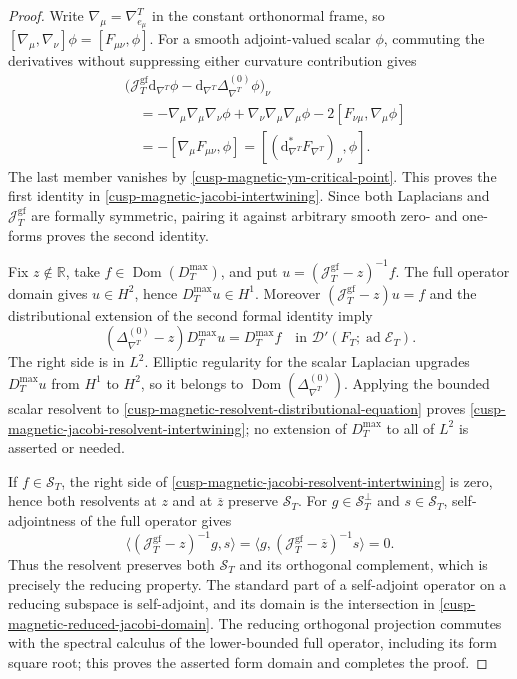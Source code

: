 \begin{proof}
Write \(\nabla_\mu=\nabla^T_{e_\mu}\) in the constant orthonormal frame,
so
\([\nabla_\mu,\nabla_\nu]\phi=[F_{\mu\nu},\phi]\).
For a smooth adjoint-valued scalar \(\phi\), commuting the derivatives
without suppressing either curvature contribution gives
\begin{align*}
 &\bigl(\mathcal J_T^{\mathrm{gf}}\mathrm d_{\nabla^T}\phi
       -\mathrm d_{\nabla^T}\Delta_{\nabla^T}^{(0)}\phi\bigr)_\nu\\
 &\quad=-\nabla_\mu\nabla_\mu\nabla_\nu\phi
         +\nabla_\nu\nabla_\mu\nabla_\mu\phi
         -2[F_{\nu\mu},\nabla_\mu\phi]\\
 &\quad=-[\nabla_\mu F_{\mu\nu},\phi]
   =[ (\mathrm d_{\nabla^T}^*F_{\nabla^T})_\nu,\phi].
\end{align*}
The last member vanishes by
\cref{cusp-magnetic-ym-critical-point}.  This proves the first identity
in \eqref{cusp-magnetic-jacobi-intertwining}.  Since both Laplacians and
\(\mathcal J_T^{\mathrm{gf}}\) are formally symmetric, pairing it against
arbitrary smooth zero- and one-forms proves the second identity.

Fix \(z\notin\mathbb R\), take
\(f\in\operatorname{Dom}(D_T^{\max})\), and put
\(u=(\mathcal J_T^{\mathrm{gf}}-z)^{-1}f\).
The full operator domain gives \(u\in H^2\), hence
\(D_T^{\max}u\in H^1\).  Moreover
\((\mathcal J_T^{\mathrm{gf}}-z)u=f\) and the distributional extension of
the second formal identity imply
\begin{equation}
 (\Delta_{\nabla^T}^{(0)}-z)D_T^{\max}u=D_T^{\max}f
 \quad\text{in }\mathcal D'(F_T;\operatorname{ad}\mathscr E_T).
 \label{cusp-magnetic-resolvent-distributional-equation}
\end{equation}
The right side is in \(L^2\).  Elliptic regularity for the scalar
Laplacian upgrades \(D_T^{\max}u\) from \(H^1\) to \(H^2\), so it belongs
to \(\operatorname{Dom}(\Delta_{\nabla^T}^{(0)})\).  Applying the bounded
scalar resolvent to
\eqref{cusp-magnetic-resolvent-distributional-equation} proves
\eqref{cusp-magnetic-jacobi-resolvent-intertwining}; no extension of
\(D_T^{\max}\) to all of \(L^2\) is asserted or needed.

If \(f\in\mathscr S_T\), the right side of
\eqref{cusp-magnetic-jacobi-resolvent-intertwining} is zero, hence both
resolvents at \(z\) and at \(\overline z\) preserve \(\mathscr S_T\).
For \(g\in\mathscr S_T^\perp\) and \(s\in\mathscr S_T\), self-adjointness
of the full operator gives
\[
 \langle(\mathcal J_T^{\mathrm{gf}}-z)^{-1}g,s\rangle
 =\langle g,(\mathcal J_T^{\mathrm{gf}}-\overline z)^{-1}s\rangle=0.
\]
Thus the resolvent preserves both \(\mathscr S_T\) and its orthogonal
complement, which is precisely the reducing property.  The standard
part of a self-adjoint operator on a reducing subspace is self-adjoint,
and its domain is the intersection in
\eqref{cusp-magnetic-reduced-jacobi-domain}.  The reducing orthogonal
projection commutes with the spectral calculus of the lower-bounded full
operator, including its form square root; this proves the asserted form
domain and completes the proof.
\end{proof}

